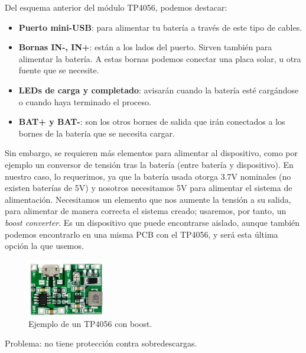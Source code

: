 \documentclass[12pt]{article}
\begin{document}
	\noindent Del esquema anterior del módulo TP4056, podemos destacar: \\
	
	\begin{itemize}
		\item \textbf{Puerto mini-USB}: para alimentar tu batería a través de este tipo de cables. 
		\item \textbf{Bornas IN-, IN+}: están a los lados del puerto. Sirven también para alimentar la batería. A estas bornas podemos conectar una placa solar, u otra fuente que se necesite.
		\item \textbf{LEDs de carga y completado}: avisarán cuando la batería esté cargándose o cuando haya terminado el proceso.
		\item \textbf{BAT+ y BAT-}: son los otros bornes de salida que irán conectados a los bornes de la batería que se necesita cargar.
	\end{itemize}

	\noindent Sin embargo, se requieren más elementos para alimentar al dispositivo, como por ejemplo un conversor de tensión tras la batería (entre batería y dispositivo). En nuestro caso, lo requerimos, ya que la batería usada otorga 3.7V nominales (no existen baterías de 5V) y nosotros necesitamos 5V para alimentar el sistema de alimentación. Necesitamos un elemento que nos aumente la tensión a su salida, para alimentar de manera correcta el sistema creado; usaremos, por tanto, un \textit{boost converter}. Es un dispositivo que puede encontrarse aislado, aunque también podemos encontrarlo en una misma PCB con el TP4056, y será esta última opción la que usemos. \\
	
	\begin{figure}[h]
		\begin{center}
			\includegraphics[width=0.3\textwidth]{img/tp4056_withBoost.png}
			\caption{Ejemplo de un TP4056 con boost.}
			\label{TP4056 con boost}
		\end{center}
	\end{figure}
	
	\noindent Problema: no tiene protección contra sobredescargas. \\
	
\end{document}

